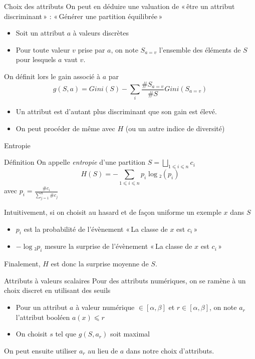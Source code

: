 \documentclass[hyperref={unicode}, xcolor={svgnames}, french]{beamer}
\begin{document}
\begin{frame}{Choix des attributs}
    On peut en déduire une valuation de « être un attribut discriminant » : « Générer une partition équilibrée »
    \begin{itemize}
         \item Soit un attribut $a$ à valeurs discrètes
         \item Pour toute valeur $v$ prise par $a$, on note $S_{a=v}$ l'ensemble des éléments de $S$ pour lesquels $a$ vaut $v$.
    \end{itemize}
    On définit lors le gain associé à $a$ par
    \begin{equation}
        g(S, a) = Gini(S) - ∑_i\frac{\#S_{a=v}}{\#S}Gini(S_{a=v})
    \end{equation}
    \begin{itemize}
        \item Un attribut est d'autant plus discriminant que son gain est élevé.
        \item On peut procéder de même avec $H$ (ou un autre indice de diversité)
    \end{itemize}
\end{frame}

\begin{frame}{Entropie}
    \begin{block}{Définition}
        On appelle \emph{entropie} d'une partition $S=⨆_{1⩽i⩽n}c_i$
        \begin{equation}
            H(S) = -∑_{1⩽i⩽n}p_i\log₂(p_i)
        \end{equation}
        avec $p_i=\frac{\#c_i}{∑_{j=1}^n\#c_j}$
    \end{block}
    Intuitivement, si on choisit au hasard et de façon uniforme un exemple $x$ dans $S$
    \begin{itemize}
        \item $p_i$ est la probabilité de l'évènement « La classe de $x$ est $c_i$ »
        \item $-\log₂p_i$ mesure la surprise de l'évènement « La classe de $x$ est $c_i$ »
    \end{itemize}
    Finalement, $H$ est donc la surprise moyenne de $S$.
\end{frame}

\begin{frame}{Attributs à valeurs scalaires}
    Pour des attributs numériques, on se ramène à un choix discret en utilisant des seuils
    \begin{itemize}
        \item Pour un attribut $a$ à valeur numérique $∈[α, β]$ et $r∈[α, β]$, on note $a_r$ l'attribut booléen $a(x)⩽r$
        \item On choisit $s$ tel que $g(S, a_r)$ soit maximal
    \end{itemize}
    On peut ensuite utiliser $a_r$ au lieu de $a$ dans notre choix d'attributs.
\end{frame}
\end{document}
